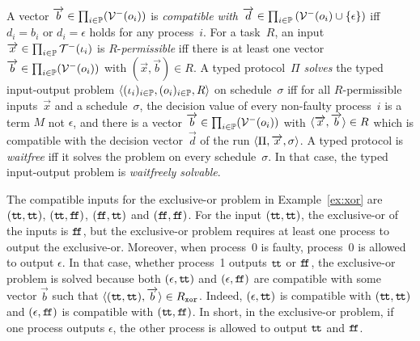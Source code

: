 A vector $\overrightarrow b\in \prod_{i\in \mathbb{P}}(\mathcal{V}^-(o_i))$
is \textit{compatible with} $\overrightarrow d \in \prod_{i\in
\mathbb{P}}\left(\mathcal{V}^-(o_i)\cup\{\epsilon\}\right)$ iff
$d_i = b_i$ or $d_i = \epsilon$ holds for any process~$i$.
For a task~$R$,
an input~$\overrightarrow x\in \prod_{i\in \mathbb{P}}\mathcal{T}^-(\iota_i)$
is \linebreak[2] $R$-\textit{permissible} iff there
is at least one
vector $\overrightarrow b\in \prod_{i\in \mathbb{P}}(\mathcal{V}^-(o_i))$ with $(\vec x, \vec b)\in R$.
A typed protocol~$\Pi$ \textit{solves} the typed input-output problem
  $\langle{(\iota_i)_{i\in \mathbb{P}}, (o_i)_{i\in \mathbb{P}}, R}\rangle$ on
schedule~$\sigma$ iff for all $R$-permissible inputs~$\vec x$ and a
schedule~$\sigma$,
 the decision value of every non-faulty process~$i$ is a term
       $M$ not $\epsilon$, and
 there is a vector $\overrightarrow b\in \prod_{i\in \mathbb{P}}(\mathcal{V}^- (o_i))$
 with $\langle{\overrightarrow x, \overrightarrow b}\rangle \in R$ which is compatible with the
 decision vector~$\vec d$ of the run $\langle{\Pi,\overrightarrow x,\sigma}\rangle$.
 A typed protocol is \textit{waitfree} iff it solves
 the problem on every schedule~$\sigma$.
 In that case, the typed input-output problem is
 \textit{waitfreely solvable}.

 \begin{example}
  The compatible inputs for the exclusive-or problem in
  Example~\ref{ex:xor} are $(\texttt{t\kern -1.2pt t},\texttt{t\kern -1.2pt t})$, $(\texttt{t\kern -1.2pt t},\texttt{f\kern -1.7pt f})$,
  $(\texttt{f\kern -1.7pt f},\texttt{t\kern -1.2pt t})$ and $(\texttt{f\kern -1.7pt f},\texttt{f\kern -1.7pt f})$.
  For the input $(\texttt{t\kern -1.2pt t},\texttt{t\kern -1.2pt t})$, the exclusive-or of the inputs is
  $\texttt{f\kern -1.7pt f}$,
  but the exclusive-or problem requires at least one process to output
  the exclusive-or.
  Moreover, when process~0 is faulty, process~0 is allowed to output
  $\epsilon$.
  In that case, whether process~1 outputs $\texttt{t\kern -1.2pt t}$ or $\texttt{f\kern -1.7pt f}$,
  the exclusive-or problem is solved because both $(\epsilon,\texttt{t\kern -1.2pt t})$ and
  $(\epsilon,\texttt{f\kern -1.7pt f})$ are compatible with some vector $\vec b$ such that
  $\langle{(\texttt{t\kern -1.2pt t},\texttt{t\kern -1.2pt t}), \overrightarrow b}\rangle \in R_{\mathtt{xor}}$.
  Indeed, $(\epsilon,\texttt{t\kern -1.2pt t})$ is compatible with $(\texttt{t\kern -1.2pt t},\texttt{t\kern -1.2pt t})$ and
  $(\epsilon,\texttt{f\kern -1.7pt f})$ is compatible with $(\texttt{t\kern -1.2pt t},\texttt{f\kern -1.7pt f})$.
  In short, in the exclusive-or problem, if one process outputs
  $\epsilon$, the other process is allowed to output $\texttt{t\kern -1.2pt t}$ and $\texttt{f\kern -1.7pt f}$.
 \end{example}

